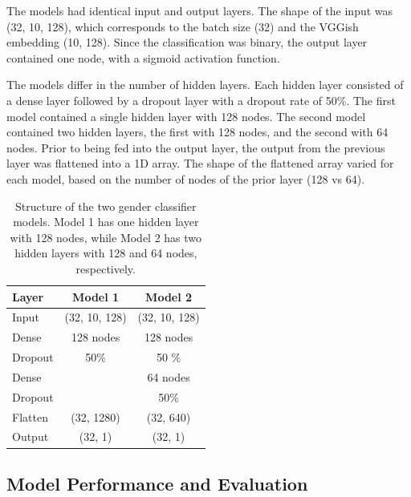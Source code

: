 The models had identical input and output layers. The shape of the input was (32, 10, 128), which corresponds to the batch size (32) and the VGGish embedding (10, 128).  Since the classification was binary, the output layer contained one node, with a sigmoid activation function.

The models differ in the number of hidden layers. Each hidden layer consisted of a dense layer followed by a dropout layer with a dropout rate of 50\%. The first model contained a single hidden layer with 128 nodes. The second model contained two hidden layers, the first with 128 nodes, and the second with 64 nodes. Prior to being fed into the output layer, the output from the previous layer was flattened into a 1D array. The shape of the flattened array varied for each model, based on the number of nodes of the prior layer (128 vs 64).

\begin{table}[!h]
\begin{center}
\caption{Structure of the two gender classifier models. Model 1 has one hidden layer with 128 nodes, while Model 2 has two hidden layers with 128 and 64 nodes, respectively.}
\begin{tabular}{l | c | c |}

Layer  & Model 1 & Model 2\\
\hline

Input 	& (32, 10, 128) & (32, 10, 128) \\ \hline

Dense	& 128 nodes & 128 nodes \\
Dropout	& 50\%		& 50 \% \\ \hline

Dense	&			& 64 nodes \\
Dropout	& 			& 50\% \\ \hline

Flatten 	& (32, 1280)	& (32, 640) \\ \hline
Output 	& (32, 1)		& (32, 1)\\
\hline
\end{tabular}
\label{tab:GenModels}
\end{center}
\end{table}

\subsection{Model Performance and Evaluation}

